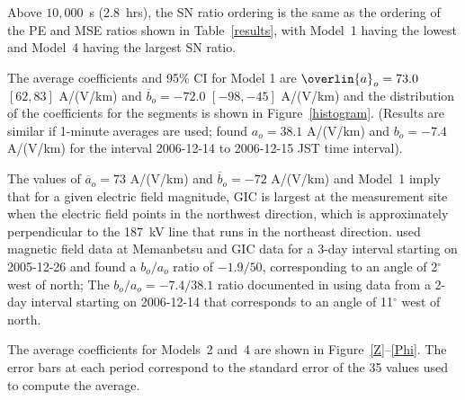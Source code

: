 \documentclass[draft,linenumbers]{agujournal2018}
\begin{document}
Above $10,000$~s (2.8~hrs), the SN ratio ordering is the same as the ordering of the PE and MSE ratios shown in Table~\ref{results}, with Model~1 having the lowest and Model~4 having the largest SN ratio.

The average coefficients and 95\% CI for Model 1 are $\overlin{a}_o = 73.0$ $[62,83]$ A/(V/km) and $\overline{b}_o = -72.0$ $[-98,-45]$ A/(V/km) and the distribution of the coefficients for the segments is shown in Figure~\ref{histogram}. (Results are similar if 1-minute averages are used; \cite{Watari2015} found $a_o=38.1$ A/(V/km) and $b_o=-7.4$ A/(V/km) for the interval 2006-12-14 to 2006-12-15 JST time interval). 

The values of $\overline{a}_o = 73$ A/(V/km) and $\overline{b}_o = -72$ A/(V/km) and Model~1 imply that for a given electric field magnitude, GIC is largest at the measurement site when the electric field points in the northwest direction, which is approximately perpendicular to the 187~kV line that runs in the northeast direction. \cite{Pulkkinen2010} used magnetic field data at Memanbetsu and GIC data for a 3-day interval starting on 2005-12-26 and found a $b_o/a_o$ ratio of $-1.9/50$, corresponding to an angle of 2$^{\circ}$ west of north; The $b_o/a_o = -7.4/38.1$ ratio documented in \cite{Watari2015} using data from a 2-day interval starting on 2006-12-14 that corresponds to an angle of 11$^{\circ}$ west of north.



The average coefficients for Models~2 and~4 are shown in Figure~\ref{Z}--\ref{Phi}. The error bars at each period correspond to the standard error of the 35 values used to compute the average.
\end{document}
